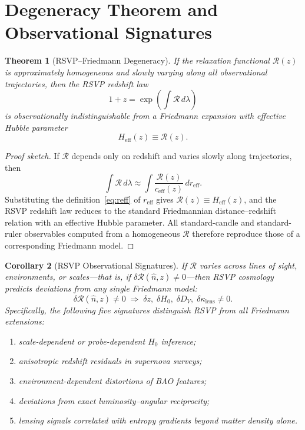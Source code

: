 \documentclass[12pt,a4paper]{article}
\newtheorem{theorem}{Theorem}[section]
\newtheorem{corollary}[theorem]{Corollary}
\theoremstyle{remark}
\newcommand{\Rcal}{\mathcal{R}}
\newcommand{\reff}{r_{\mathrm{eff}}}
\newcommand{\Heff}{H_{\mathrm{eff}}}
\newcommand{\ceff}{c_{\mathrm{eff}}}
\begin{document}
\section{Degeneracy Theorem and Observational Signatures}
\label{sec:degeneracy}

\begin{theorem}[RSVP--Friedmann Degeneracy]
\label{thm:degeneracy}
If the relaxation functional $\Rcal(z)$ is approximately homogeneous and slowly varying along all observational trajectories, then the RSVP redshift law
\begin{equation}
1 + z = \exp\!\left(\int \Rcal\, d\lambda\right)
\end{equation}
is observationally indistinguishable from a Friedmann expansion with effective Hubble parameter
\begin{equation}
\Heff(z) \equiv \Rcal(z).
\end{equation}
\end{theorem}

\begin{proof}[Proof sketch]
If $\Rcal$ depends only on redshift and varies slowly along trajectories, then
\begin{equation}
\int \Rcal\, d\lambda \approx \int \frac{\Rcal(z)}{\ceff(z)}\, dr_{\mathrm{eff}}.
\end{equation}
Substituting the definition~\eqref{eq:reff} of $\reff$ gives $\Rcal(z) \equiv \Heff(z)$, and the RSVP redshift law reduces to the standard Friedmannian distance--redshift relation with an effective Hubble parameter. All standard-candle and standard-ruler observables computed from a homogeneous $\Rcal$ therefore reproduce those of a corresponding Friedmann model.
\end{proof}

\begin{corollary}[RSVP Observational Signatures]
\label{cor:signatures}
If $\Rcal$ varies across lines of sight, environments, or scales---that is, if $\delta\Rcal(\hat{n}, z) \ne 0$---then RSVP cosmology predicts deviations from any single Friedmann model:
\begin{equation}
\delta\Rcal(\hat{n}, z) \ne 0 \;\Longrightarrow\;
\delta z,\; \delta H_0,\; \delta D_V,\; \delta\kappa_{\mathrm{lens}} \ne 0.
\end{equation}
Specifically, the following five signatures distinguish RSVP from all Friedmann extensions:
\begin{enumerate}[leftmargin=2em]
\item scale-dependent or probe-dependent $H_0$ inference;
\item anisotropic redshift residuals in supernova surveys;
\item environment-dependent distortions of BAO features;
\item deviations from exact luminosity--angular reciprocity;
\item lensing signals correlated with entropy gradients beyond matter density alone.
\end{enumerate}
\end{corollary}
\end{document}
